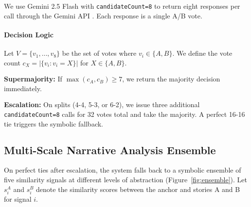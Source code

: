 \documentclass[11pt]{article}
\begin{document}
We use Gemini 2.5 Flash \citep{google-gemini-2-5-flash-2025} with \texttt{candidateCount=8} to return eight responses per call through the Gemini API \citep{google-generative-ai-api-2025}. Each response is a single A/B vote.

\paragraph{Decision Logic}
Let $V = \{v_1, \ldots, v_8\}$ be the set of votes where $v_i \in \{A, B\}$. We define the vote count $c_X = |\{v_i : v_i = X\}|$ for $X \in \{A, B\}$.

\textbf{Supermajority:} If $\max(c_A, c_B) \geq 7$, we return the majority decision immediately.

\textbf{Escalation:} On splits (4-4, 5-3, or 6-2), we issue three additional \texttt{candidateCount=8} calls for 32 votes total and take the majority. A perfect 16-16 tie triggers the symbolic fallback.

\subsection{Multi-Scale Narrative Analysis Ensemble}

On perfect ties after escalation, the system falls back to a symbolic ensemble of five similarity signals at different levels of abstraction (Figure~\ref{fig:ensemble}). Let $s_i^A$ and $s_i^B$ denote the similarity scores between the anchor and stories A and B for signal $i$.
\end{document}
